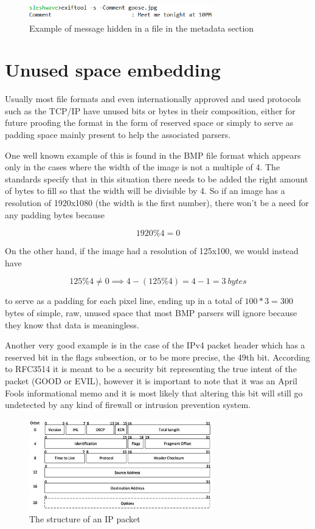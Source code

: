 \begin{multicols*}{2}
\begin{figure}[H]
    \centering
    \includegraphics[width=8cm,keepaspectratio]{pics/metadata_message_identified}
    \caption{Example of message hidden in a file in the metadata section}
    \label{MetadataMessageExample}
\end{figure}

\section{Unused space embedding} \label{Unused_Space_Chapter}
Usually most file formats and even internationally approved and used protocols such as the TCP/IP have unused bits or bytes in their composition, either for future proofing the format in the form of reserved space or simply to serve as padding space mainly present to help the associated parsers. 

One well known example of this is found in the BMP file format which appears only in the cases where the width of the image is not a multiple of 4. The standards specify that in this situation there needs to be added the right amount of bytes to fill so that the width will be divisible by 4. So if an image has a resolution of 1920x1080 (the width is the first number), there won't be a need for any padding bytes because 

\[1920 \% 4 = 0\]

On the other hand, if the image had a resolution of 125x100, we would instead have

\[125 \% 4 \neq 0 \implies 4 - (125 \% 4) = 4 - 1 = 3\ bytes\]

to serve as a padding for each pixel line, ending up in a total of $100 * 3 = 300$ bytes of simple, raw, unused space that most BMP parsers will ignore because they know that data is meaningless. 

Another very good example is in the case of the IPv4 packet header which has a reserved bit in the flags subsection, or to be more precise, the 49th bit. According to RFC3514\cite{RFC3514} it is meant to be a security bit representing the true intent of the packet (GOOD or EVIL), however it is important to note that it was an April Fools informational memo and it is most likely that altering this bit will still go undetected by any kind of firewall or intrusion prevention system.

\begin{figure}[H]
    \centering
    \includegraphics[width=8cm,keepaspectratio]{pics/ip_packet_specifier}
    \caption{The structure of an IP packet}
    \label{IP_Packet_Specifier}
\end{figure}


\end{multicols*}
